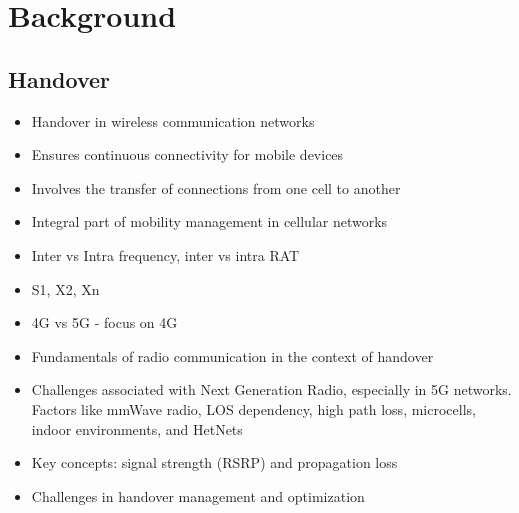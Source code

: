 \chapter{Background}
\section{Handover}
\begin{itemize}
  \item Handover in wireless communication networks
  \item Ensures continuous connectivity for mobile devices
  \item Involves the transfer of connections from one cell to another
  \item Integral part of mobility management in cellular networks
  \item Inter vs Intra frequency, inter vs intra RAT
  \item S1, X2, Xn
\end{itemize}
\begin{itemize}
  \item 4G vs 5G - focus on 4G
  \item Fundamentals of radio communication in the context of handover
  \item Challenges associated with Next Generation Radio, especially in 5G networks. Factors like mmWave radio, LOS dependency, high path loss, microcells, indoor environments, and HetNets
  \item Key concepts: signal strength (RSRP) and propagation loss
  \item Challenges in handover management and optimization
\end{itemize}


